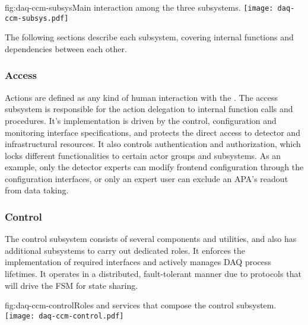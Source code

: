 \begin{dunefigure}{fig:daq-ccm-subsys}{Main interaction among the three  subsystems.}
  \texttt{[image: daq-ccm-subsys.pdf]}
\end{dunefigure}

The following sections describe each  subsystem, covering internal functions and dependencies between each other.

\subsubsection{Access}
\label{sec:daq:design:ccm:access}
Actions are defined as any kind of human interaction with the . The access subsystem is responsible for the action delegation to internal function calls and procedures. It’s implementation is driven by the control, configuration and monitoring interface specifications, and protects the direct access to detector and infrastructural resources. It also controls authentication and authorization, which locks different functionalities to certain actor groups and subsystems. As an example, only the detector experts can modify frontend configuration through the configuration interfaces, or only an expert user can exclude an APA’s readout from data taking. 


\subsubsection{Control}
\label{sec:daq:design:ccm:control}

The control subsystem consists of several components and utilities, and also has additional subsystems to carry out dedicated roles. It enforces the implementation of required interfaces and actively manages DAQ process lifetimes. It operates in a distributed, fault-tolerant manner due to protocols that will drive the FSM for state sharing. 

\begin{dunefigure}{fig:daq-ccm-control}{Roles and services that compose the  control subsystem.}
  \texttt{[image: daq-ccm-control.pdf]}
\end{dunefigure}

